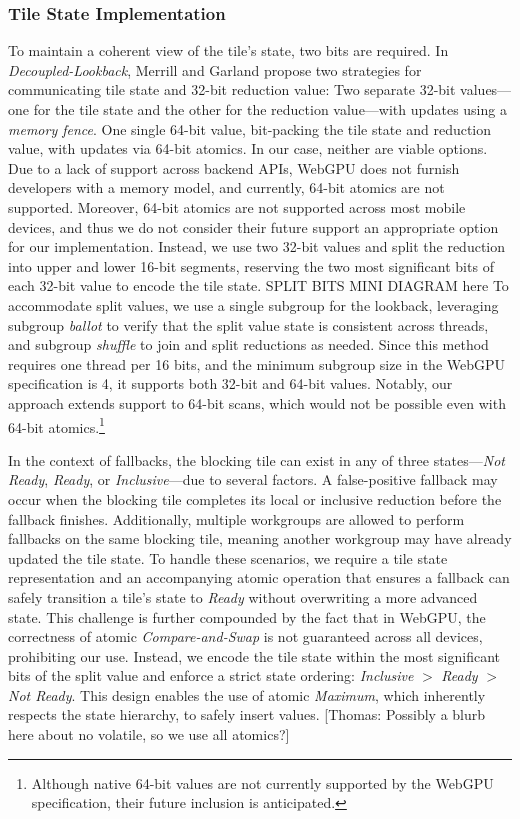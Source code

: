 \documentclass[sigconf]{acmart}
\newcommand{\thomas}[1]{{\footnotesize\color{orange}[Thomas: #1]}}
\begin{document}
\subsubsection{Tile State Implementation}
To maintain a coherent view of the tile's state, two bits are required. In \emph{Decoupled-Lookback}, Merrill and Garland propose two strategies for communicating tile state and 32-bit reduction value: Two separate 32-bit values---one for the tile state and the other for the reduction value---with updates using a \emph{memory fence}. One single 64-bit value, bit-packing the tile state and reduction value, with updates via 64-bit atomics.
In our case, neither are viable options. Due to a lack of support across backend APIs, WebGPU does not furnish developers with a memory model, and currently, 64-bit atomics are not supported. Moreover, 64-bit atomics are not supported across most mobile devices, and thus we do not consider their future support an appropriate option for our implementation. Instead, we use two 32-bit values and split the reduction into upper and lower 16-bit segments, reserving the two most significant bits of each 32-bit value to encode the tile state.
\newline
SPLIT BITS MINI DIAGRAM here
\newline
To accommodate split values, we use a single subgroup for the lookback, leveraging subgroup \emph{ballot} to verify that the split value state is consistent across threads, and subgroup \emph{shuffle} to join and split reductions as needed. Since this method requires one thread per 16 bits, and the minimum subgroup size in the WebGPU specification is 4, it supports both 32-bit and 64-bit values. Notably, our approach extends support to 64-bit scans, which would not be possible even with 64-bit atomics.\footnote{Although native 64-bit values are not currently supported by the WebGPU specification, their future inclusion is anticipated.}

In the context of fallbacks, the blocking tile can exist in any of three states—\emph{Not Ready}, \emph{Ready}, or \emph{Inclusive}—due to several factors. A false-positive fallback may occur when the blocking tile completes its local or inclusive reduction before the fallback finishes. Additionally, multiple workgroups are allowed to perform fallbacks on the same blocking tile, meaning another workgroup may have already updated the tile state. To handle these scenarios, we require a tile state representation and an accompanying atomic operation that ensures a fallback can safely transition a tile's state to \emph{Ready} without overwriting a more advanced state. This challenge is further compounded by the fact that in WebGPU, the correctness of atomic \emph{Compare-and-Swap} is not guaranteed across all devices, prohibiting our use. Instead, we encode the tile state within the most significant bits of the split value and enforce a strict state ordering: \emph{Inclusive} $>$ \emph{Ready} $>$ \emph{Not Ready}. This design enables the use of atomic \emph{Maximum}, which inherently respects the state hierarchy, to safely insert values.
\thomas{Possibly a blurb here about no volatile, so we use all atomics?}
\end{document}
